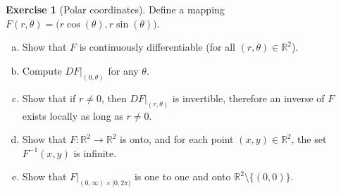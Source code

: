 \documentclass[12pt,openany]{book}
\newcommand{\R}{{\mathbb{R}}}
\theoremstyle{plain}
\theoremstyle{remark}
\theoremstyle{definition}
\newenvironment{exbox}{%
    \def\FrameCommand{\vrule width 1pt \relax\hspace {10pt}}%
    \MakeFramed {\advance \hsize -\width \FrameRestore }%
}{%
    \endMakeFramed
}
\newenvironment{exparts}{%
    \leavevmode\begin{enumerate}[a),noitemsep,topsep=0pt,parsep=0pt,partopsep=0pt]
}{%
    \end{enumerate}
}
\theoremstyle{exercise}
\newtheorem{exercise}{Exercise}[section]
\theoremstyle{example}
\begin{document}
\begin{exbox}
\begin{exercise}[Polar coordinates] \label{mv:exercise:polarcoordinates}
Define a mapping $F(r,\theta) = \bigl(r \cos(\theta), r \sin(\theta) \bigr)$.
\begin{exparts}
\item
Show that $F$ is continuously differentiable (for all $(r,\theta) \in
\R^2$).
\item
Compute $DF|_{(0,\theta)}$ for any $\theta$.
\item
Show that if $r \not= 0$, then $DF|_{(r,\theta)}$ is invertible, therefore an
inverse of $F$ exists locally as long as $r \not= 0$.
\item
Show that $F \colon \R^2 \to \R^2$ is onto, and for each point $(x,y) \in
\R^2$, the set $F^{-1}(x,y)$ is infinite.
\item
Show that $F|_{(0,\infty) \times [0,2\pi)}$ is one to one and onto
$\R^2 \setminus \bigl\{ (0,0) \bigr\}$.
\end{exparts}
\end{exercise}
\end{exbox}


\def\myDOI#1{\href{http://dx.doi.org/#1}{#1}}
\end{document}
